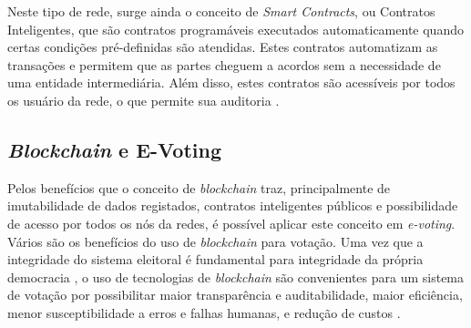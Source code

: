 \documentclass[portuguese]{textolivre}
\begin{document}
	Neste tipo de rede, surge ainda o conceito de \emph{Smart Contracts}, ou Contratos Inteligentes, que são contratos programáveis executados automaticamente quando certas condições pré-definidas são atendidas. Estes contratos automatizam as transações e permitem que as partes cheguem a acordos sem a necessidade de uma entidade intermediária. Além disso, estes contratos são acessíveis por todos os usuário da rede, o que permite sua auditoria \cite{hjalmarsson2018blockchain, Tanwar2024}.
	
	
	\subsection{\emph{Blockchain} e E-Voting}
	
	Pelos benefícios que o conceito de \emph{blockchain} traz, principalmente de imutabilidade de dados registados, contratos inteligentes públicos e possibilidade de acesso por todos os nós da redes, é possível aplicar este conceito em \textit{e-voting}. Vários são os benefícios do uso de \emph{blockchain} para votação. Uma vez que a integridade do sistema eleitoral é fundamental para integridade da própria democracia \cite{kohno2004analysis}, o uso de tecnologias de \emph{blockchain} são convenientes para um sistema de votação por possibilitar maior transparência e auditabilidade, maior eficiência, menor susceptibilidade a erros e falhas humanas, e redução de custos %
\cite{fornasier2022democracia, 10.1007/978-981-19-1976-3_18, Tanwar2024, electronics13010017}.
	
	
	
\end{document}
